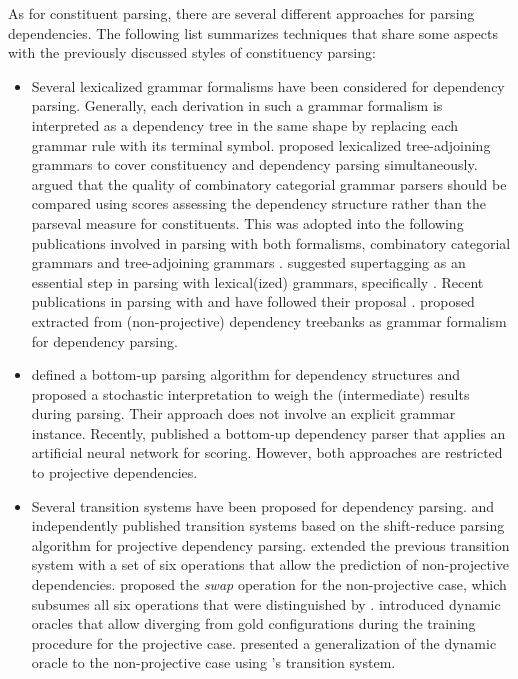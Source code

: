 \documentclass[../document.tex]{subfiles}
\begin{document}
    As for constituent parsing, there are several different approaches for parsing dependencies.
    The following list summarizes techniques that share some aspects with the previously discussed styles of constituency parsing:
    \begin{itemize}
        \item Several lexicalized grammar formalisms have been considered for dependency parsing.
            Generally, each derivation in such a grammar formalism is interpreted as a dependency tree in the same shape by replacing each grammar rule with its terminal symbol.
             proposed lexicalized tree-adjoining grammars to cover constituency and dependency parsing simultaneously.
             argued that the quality of combinatory categorial grammar parsers should be compared using scores assessing the dependency structure rather than the parseval measure for constituents.
            This was adopted into the following publications involved in parsing with both formalisms, combinatory categorial grammars and tree-adjoining grammars \citep{Kas17,Bla18}.
             suggested supertagging as an essential step in parsing with lexical(ized) grammars, specifically .
            Recent publications in parsing with  and  have followed their proposal \citep{Kas17,LewisSteedman14}.
             proposed  extracted from (non-projective) dependency treebanks as grammar formalism for dependency parsing.
        \item {} defined a bottom-up parsing algorithm for dependency structures and proposed a stochastic interpretation to weigh the (intermediate) results during parsing.
            Their approach does not involve an explicit grammar instance.
            Recently, \citet{yang-tu-2022-headed} published a bottom-up dependency parser that applies an artificial neural network for scoring.
            However, both approaches are restricted to projective dependencies.
        \item Several transition systems have been proposed for dependency parsing.
             and \citet{yamada-matsumoto-2003-statistical} independently published transition systems based on the shift-reduce parsing algorithm for projective dependency parsing.
             extended the previous transition system with a set of six operations that allow the prediction of non-projective dependencies.
             proposed the \emph{swap} operation for the non-projective case, which subsumes all six operations that were distinguished by \citeauthor{attardi-2006-experiments}.
             introduced dynamic oracles that allow diverging from gold configurations during the training procedure for the projective case.
             presented a generalization of the dynamic oracle to the non-projective case using \citeauthor{attardi-2006-experiments}'s transition system.
    \end{itemize}
\end{document}
